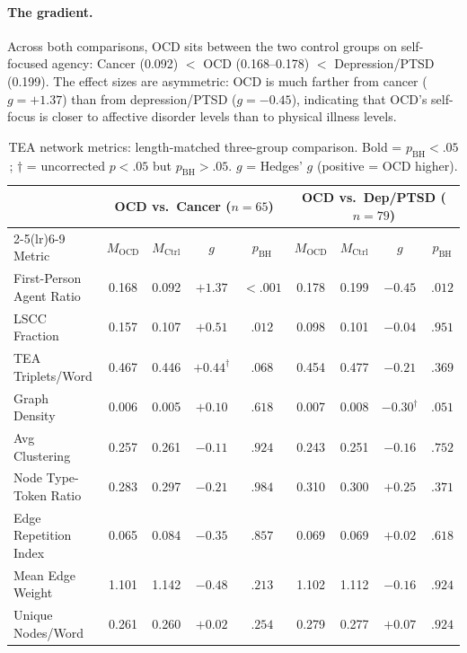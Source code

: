\documentclass[11pt,a4paper]{article}
\begin{document}
\paragraph{The gradient.}
Across both comparisons, OCD sits between the two control groups on self-focused agency: Cancer (0.092) $<$ OCD (0.168--0.178) $<$ Depression/PTSD (0.199). The effect sizes are asymmetric: OCD is much farther from cancer ($g = +1.37$) than from depression/PTSD ($g = -0.45$), indicating that OCD's self-focus is closer to affective disorder levels than to physical illness levels.

\begin{table}[t]
\centering
\caption{TEA network metrics: length-matched three-group comparison. Bold = $p_\mathrm{BH} < .05$; $\dagger$ = uncorrected $p < .05$ but $p_\mathrm{BH} > .05$. $g$ = Hedges' $g$ (positive = OCD higher).}
\label{tab:tea}
\small
\begin{tabular}{@{}l cccc cccc@{}}
\toprule
 & \multicolumn{4}{c}{\textbf{OCD vs.\ Cancer} ($n=65$)} & \multicolumn{4}{c}{\textbf{OCD vs.\ Dep/PTSD} ($n=79$)} \\
\cmidrule(lr){2-5}\cmidrule(lr){6-9}
Metric & $M_\mathrm{OCD}$ & $M_\mathrm{Ctrl}$ & $g$ & $p_\mathrm{BH}$ & $M_\mathrm{OCD}$ & $M_\mathrm{Ctrl}$ & $g$ & $p_\mathrm{BH}$ \\
\midrule
First-Person Agent Ratio & 0.168 & 0.092 & $\mathbf{+1.37}$ & ${<}.001$ & 0.178 & 0.199 & $\mathbf{-0.45}$ & $.012$ \\
LSCC Fraction            & 0.157 & 0.107 & $\mathbf{+0.51}$ & $.012$ & 0.098 & 0.101 & $-0.04$ & $.951$ \\
TEA Triplets/Word        & 0.467 & 0.446 & $+0.44^\dagger$ & $.068$ & 0.454 & 0.477 & $-0.21$ & $.369$ \\
Graph Density            & 0.006 & 0.005 & $+0.10$           & $.618$ & 0.007 & 0.008 & $-0.30^\dagger$ & $.051$ \\
Avg Clustering           & 0.257 & 0.261 & $-0.11$           & $.924$ & 0.243 & 0.251 & $-0.16$ & $.752$ \\
Node Type-Token Ratio    & 0.283 & 0.297 & $-0.21$           & $.984$ & 0.310 & 0.300 & $+0.25$ & $.371$ \\
Edge Repetition Index    & 0.065 & 0.084 & $-0.35$           & $.857$ & 0.069 & 0.069 & $+0.02$ & $.618$ \\
Mean Edge Weight         & 1.101 & 1.142 & $-0.48$           & $.213$ & 1.102 & 1.112 & $-0.16$ & $.924$ \\
Unique Nodes/Word        & 0.261 & 0.260 & $+0.02$           & $.254$ & 0.279 & 0.277 & $+0.07$ & $.924$ \\
\bottomrule
\end{tabular}
\end{table}
\end{document}
